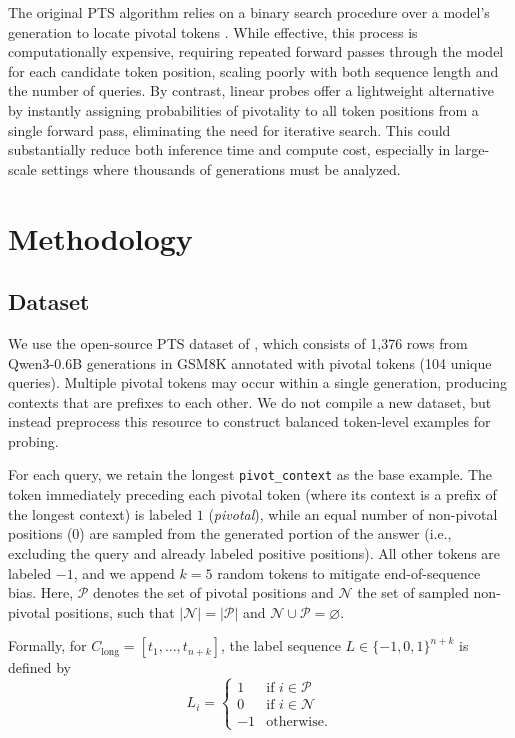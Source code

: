 \documentclass[11pt]{article}
\begin{document}
The original PTS algorithm relies on a binary search procedure over a model's generation to locate pivotal tokens \citep{abdin2024phi4technicalreport,pts}. While effective, this process is computationally expensive, requiring repeated forward passes through the model for each candidate token position, scaling poorly with both sequence length and the number of queries. By contrast, linear probes offer a lightweight alternative by instantly assigning probabilities of pivotality to all token positions from a single forward pass, eliminating the need for iterative search. This could substantially reduce both inference time and compute cost, especially in large-scale settings where thousands of generations must be analyzed. 

\section{Methodology}

\subsection{Dataset}

We use the open-source PTS dataset of \citet{codelionQwen3}, which consists of 1,376 rows from Qwen3-0.6B generations in GSM8K annotated with pivotal tokens (104 unique queries). Multiple pivotal tokens may occur within a single generation, producing contexts that are prefixes to each other. We do not compile a new dataset, but instead preprocess this resource to construct balanced token-level examples for probing.

For each query, we retain the longest \texttt{pivot\_context} as the base example. The token immediately preceding each pivotal token (where its context is a prefix of the longest context) is labeled $1$ (\emph{pivotal}), while an equal number of non-pivotal positions ($0$) are sampled from the generated portion of the answer (i.e., excluding the query and already labeled positive positions). All other tokens are labeled $-1$, and we append $k{=}5$ random tokens to mitigate end-of-sequence bias. Here, $\mathcal{P}$ denotes the set of pivotal positions and $\mathcal{N}$ the set of sampled non-pivotal positions, such that $|\mathcal{N}| = |\mathcal{P}|$ and $\mathcal{N} \cup \mathcal{P} = \varnothing$. 

Formally, for $C_{\text{long}} = [t_1,\dots,t_{n+k}]$, the label sequence $L \in \{-1,0,1\}^{n+k}$ is defined by
\[
L_i =
\begin{cases}
1 & \text{if } i \in \mathcal{P} \\
0 & \text{if } i \in \mathcal{N} \\
-1 & \text{otherwise.}
\end{cases}
\]
\end{document}
